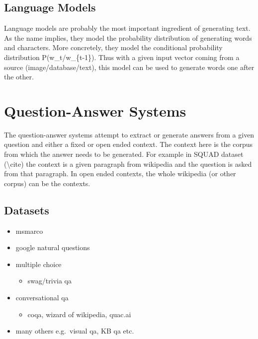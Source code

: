 \documentclass[]{krantz}
\providecommand{\tightlist}{%
  \setlength{\itemsep}{0pt}\setlength{\parskip}{0pt}}
\begin{document}
\hypertarget{language-models}{%
\subsection{Language Models}\label{language-models}}

Language models are probably the most important ingredient of generating text. As the name implies, they model the probability distribution of generating words and characters. More concretely, they model the conditional probability distribution P(w\_t/w\_\{t-1\}). Thus with a given input vector coming from a source (image/database/text), this model can be used to generate words one after the other.

\hypertarget{question-answer-systems}{%
\section{Question-Answer Systems}\label{question-answer-systems}}

The question-answer systems attempt to extract or generate answers from a given question and either a fixed or open ended context. The context here is the corpus from which the answer needs to be generated. For example in SQUAD dataset (\textbackslash{}cite) the context is a given paragraph from wikipedia and the question is asked from that paragraph. In open ended contexts, the whole wikipedia (or other corpus) can be the contexts.

\hypertarget{datasets}{%
\subsection{Datasets}\label{datasets}}

\begin{itemize}
\tightlist
\item
  msmarco
\item
  google natural questions
\item
  multiple choice

  \begin{itemize}
  \tightlist
  \item
    swag/trivia qa
  \end{itemize}
\item
  conversational qa

  \begin{itemize}
  \tightlist
  \item
    coqa, wizard of wikipedia, quac.ai
  \end{itemize}
\item
  many others e.g.~visual qa, KB qa etc.
\end{itemize}
\end{document}
